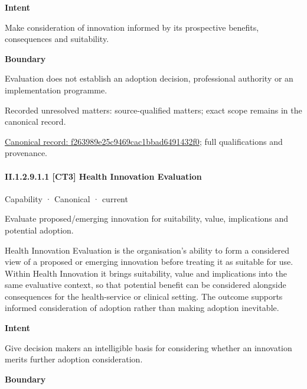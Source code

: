 \textbf{Intent}



Make consideration of innovation informed by its prospective benefits, consequences and suitability.



\textbf{Boundary}



Evaluation does not establish an adoption decision, professional authority or an implementation programme.


{\small Recorded unresolved matters: source-qualified matters; exact scope remains in the canonical record.}\par
{\footnotesize \href{../../../../continuum/strategy/capability/f263989e25c9469cac1bbad6491432f0.md}{Canonical record: f263989e25c9469cac1bbad6491432f0}; full qualifications and provenance.}\par
\paragraph*{II.1.2.9.1.1 [CT3] Health Innovation Evaluation}
\label{navigation:II.1.2.9.1.1}

\label{element:adc555bcb54e4de290869c7deebd128c}
{\small Capability · Canonical · current}\par

Evaluate proposed/emerging innovation for suitability, value, implications and potential adoption.



Health Innovation Evaluation is the organisation's ability to form a considered view of a proposed or emerging innovation before treating it as suitable for use. Within Health Innovation it brings suitability, value and implications into the same evaluative context, so that potential benefit can be considered alongside consequences for the health-service or clinical setting. The outcome supports informed consideration of adoption rather than making adoption inevitable.



\textbf{Intent}



Give decision makers an intelligible basis for considering whether an innovation merits further adoption consideration.



\textbf{Boundary}




